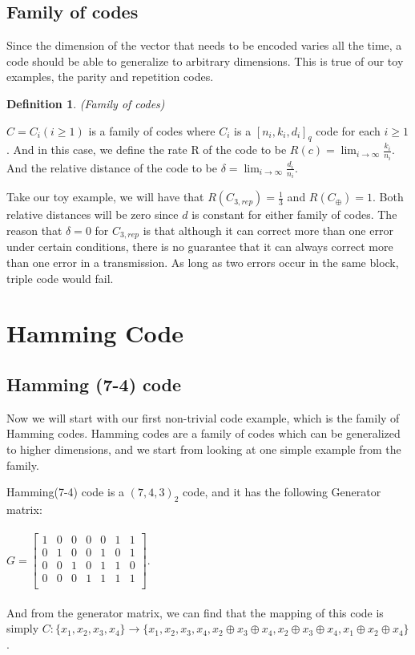 \documentclass{article}
\newtheorem{Definition}{Definition}
\begin{document}
\subsection{Family of codes}
Since the dimension of the vector that needs to be encoded varies all the time, a code should be able to generalize to arbitrary dimensions. This is true of our toy examples, the parity and repetition codes.
\begin{Definition}(Family of codes)\end{Definition}
\noindent $C = C_i(i \ge 1)$ is a family of codes where $C_i$ is a $[n_i,k_i,d_i]_q$ code for each $i \ge 1$. And in this case, we define the rate R of the code to be $ R(c) = \lim_{i\to\infty} \frac{k_i}{n_i}$. And the relative distance of the code to be $\delta = \lim_{i\to\infty} \frac{d_i}{n_i}$.

Take our toy example, we will have that $R(C_{3,rep}) = \frac{1}{3}$ and $R(C_\oplus) = 1$. Both relative distances will be zero since $d$ is constant for either family of codes. The reason that $\delta = 0$ for $C_{3,rep}$ is that although it can correct more than one error under certain conditions, there is no guarantee that it can always correct more than one error in a transmission. As long as two errors occur in the same block, triple code would fail.

\section{Hamming Code}
\subsection{Hamming (7-4) code}
Now we will start with our first non-trivial code example, which is the family of Hamming codes. Hamming codes are a family of codes which can be generalized to higher dimensions, and we start from looking at one simple example from the family.

Hamming(7-4) code is a $(7,4,3)_2$ code, and it has the following Generator matrix: \\\\
$G = \begin{bmatrix}
	1 & 0 & 0 & 0 & 0 & 1 & 1 \\
	0 & 1 & 0 & 0 & 1 & 0 & 1 \\
	0 & 0 & 1 & 0 & 1 & 1 & 0  \\
	0 & 0 & 0 & 1 & 1 & 1 & 1 \\
    \end{bmatrix}$.\\\\
And from the generator matrix, we can find that the mapping of this code is simply 
$C: \{x_1, x_2, x_3,x_4\} \rightarrow \{x_1,x_2,x_3,x_4, x_2\oplus x_3\oplus x_4,x_2\oplus x_3\oplus x_4,x_1\oplus x_2\oplus x_4\}$.
\end{document}
